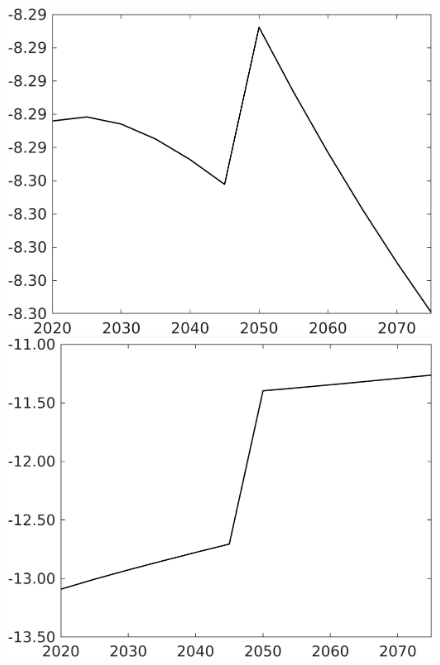 \documentclass[12pt]{article}
\begin{document}
\begin{figure}[h!!]
\begin{minipage}[]{0.32\textwidth}
	\end{minipage}
	\begin{minipage}[]{0.32\textwidth}
		\includegraphics[width=1\textwidth]{../../codding_model/own_basedOnFried/optimalPol_010922_revision/figures/all_13Sept22/CompTaufPER_bytaul_Reg0_Ln_spillover0_nsk0_xgr0_knspil1_sep1_LFlimit1_emsbase0_countec0_GovRev0_etaa0.79_lgd0.png}
	\end{minipage}			
	\begin{minipage}[]{0.32\textwidth}
		\includegraphics[width=1\textwidth]{../../codding_model/own_basedOnFried/optimalPol_010922_revision/figures/all_13Sept22/CompTaufPER_bytaul_Reg0_GFF_spillover0_nsk0_xgr0_knspil1_sep1_LFlimit1_emsbase0_countec0_GovRev0_etaa0.79_lgd0.png}

\end{minipage}
\end{figure}
\end{document}
